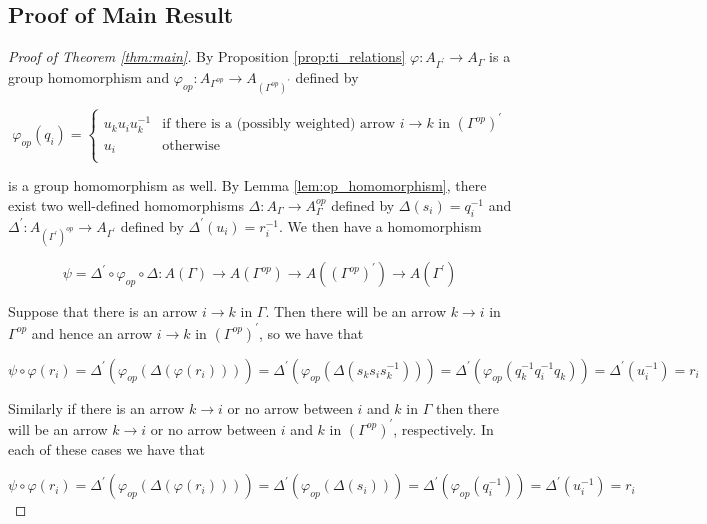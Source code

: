 \documentclass[11pt]{amsart}
\theoremstyle{definition}
\begin{document}
\subsection{Proof of Main Result}\label{sec:proof_of_main_result}

\begin{proof}[Proof of Theorem \ref{thm:main}]
By Proposition \ref{prop:ti_relations} $\varphi\colon A_{\Gamma^\prime}\rightarrow A_\Gamma$ is a group homomorphism and $\varphi_{op}\colon A_{\Gamma^{op}}\rightarrow A_{\left(\Gamma^{op}\right)^\prime}$ defined by

\begin{displaymath}
\varphi_{op}(q_i) = \begin{cases}    u_ku_iu_k^{-1} & \mbox{if there is a (possibly weighted) arrow } i \rightarrow k \mbox{ in } \left(\Gamma^{op}\right)^\prime\\
				u_i & \mbox{otherwise}\\
	\end{cases}
\end{displaymath}

\noindent is a group homomorphism as well.  By Lemma \ref{lem:op_homomorphism}, there exist two well-defined homomorphisms $\Delta\colon A_{\Gamma}\rightarrow A_\Gamma^{op}$ defined by $\Delta(s_i) = q_i^{-1}$ and $\Delta^\prime\colon A_{\left(\Gamma^\prime\right)^{op}} \rightarrow A_{\Gamma^\prime}$ defined by $\Delta^\prime(u_i) = r_i^{-1}$. We then have a homomorphism 

$$\psi = \Delta^\prime\circ\varphi_{op}\circ\Delta\colon A(\Gamma)\rightarrow A(\Gamma^{op})\rightarrow A(\left(\Gamma^{op}\right)^{\prime}) \rightarrow A(\Gamma^{\prime})$$

Suppose that there is an arrow $i\rightarrow k$ in $\Gamma$. Then there will be an arrow $k\rightarrow i$ in $\Gamma^{op}$ and hence an arrow $i\rightarrow k$ in $\left(\Gamma^{op}\right)^{\prime}$, so we have that

$$\psi\circ\varphi(r_i) = \Delta^\prime(\varphi_{op}(\Delta(\varphi(r_i)))) = \Delta^\prime(\varphi_{op}(\Delta(s_ks_is_k^{-1}))) = \Delta^\prime(\varphi_{op}(q_k^{-1}q_i^{-1}q_k)) = \Delta^\prime(u_i^{-1}) = r_i$$

Similarly if there is an arrow $k\rightarrow i$ or no arrow between $i$ and $k$ in $\Gamma$ then there will be an arrow $k\rightarrow i$ or no arrow between $i$ and $k$ in $\left(\Gamma^{op}\right)^{\prime}$, respectively. In each of these cases we have that

$$\psi\circ\varphi(r_i) = \Delta^\prime(\varphi_{op}(\Delta(\varphi(r_i)))) = \Delta^\prime(\varphi_{op}(\Delta(s_i))) = \Delta^\prime(\varphi_{op}(q_i^{-1})) = \Delta^\prime(u_i^{-1}) = r_i$$



\end{proof}
\end{document}
